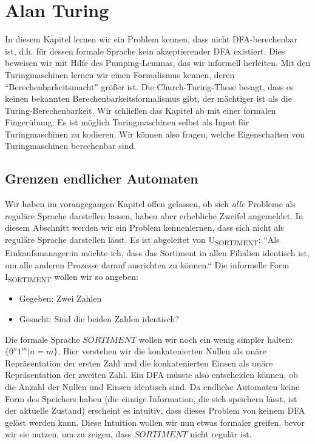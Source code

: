 \chapter{Alan Turing}\label{turing}

In diesem Kapitel lernen wir ein Problem kennen,
dass nicht DFA-berechenbar ist,
d.h. für dessen formale Sprache kein akzeptierender DFA existiert.
Dies beweisen wir mit Hilfe des Pumping-Lemmas,
das wir informell herleiten.
Mit den Turingmaschinen lernen wir einen Formalismus kennen,
deren ``Berechenbarkeitsmacht'' größer ist.
Die Church-Turing-These besagt,
dass es keinen bekannten Berechenbarkeitsformalismus gibt,
der mächtiger ist als die Turing-Berechenbarkeit.
Wir schließen das Kapitel ab mit einer formalen Fingerübung:
Es ist möglich Turingmaschinen selbst als Input für Turingmaschinen zu kodieren.
Wir können also fragen, welche Eigenschaften von Turingmaschinen berechenbar sind.

\section{Grenzen endlicher Automaten}\label{pumping}
Wir haben im vorangegangen Kapitel offen gelassen,
ob sich \emph{alle} Probleme als reguläre Sprache darstellen lassen,
haben aber erhebliche Zweifel angemeldet.
In diesem Abschnitt werden wir ein Problem kennenlernen,
dass sich nicht als reguläre Sprache darstellen lässt.
Es ist abgeleitet von U\textsubscript{SORTIMENT}:
``Als Einkaufsmanager:in möchte ich,
dass das Sortiment in allen Filialien identisch ist,
um alle anderen Prozesse darauf ausrichten zu können.``
Die informelle Form
I\textsubscript{SORTIMENT}
wollen wir so angeben:
\begin{itemize}
    \item Gegeben: Zwei Zahlen
    \item Gesucht: Sind die beiden Zahlen identisch?
\end{itemize}
Die formale Sprache $SORTIMENT$ wollen wir noch ein wenig simpler halten:
$\{0^n1^m|n=m\}$.
Hier verstehen wir die konkatenierten Nullen als unäre Repräsentation der ersten Zahl
und die konkatenierten Einsen als unäre Repräsentation der zweiten Zahl.
Ein DFA müsste also entscheiden können, ob die Anzahl der Nullen und Einsen identisch sind.
Da endliche Automaten keine Form des Speichers haben
(die einzige Information, die sich speichern lässt, ist der aktuelle Zustand)
erscheint es intuitiv, dass dieses Problem von keinem DFA gelöst werden kann.
Diese Intuition wollen wir nun etwas formaler greifen,
bevor wir sie nutzen, um zu zeigen, dass $SORTIMENT$ nicht regulär ist.

